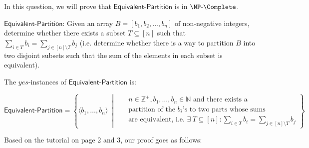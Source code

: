 In this question, we will prove that $\mathsf{Equivalent \text{-} Partition}$ is in $\NP \text{-} \Complete$.

$\mathsf{Equivalent \text{-} Partition}$: Given an array \(B=[b_1,b_2,...,b_n]\) of non-negative integers, determine whether there exists a subset $T \subseteq [n]$ such that $\sum_{i\in T} b_i = \sum_{j \in [n] \setminus T} b_j $ (i.e. determine whether there is a way to partition $B$ into two disjoint subsets such that the sum of the elements in each subset is equivalent).

The $yes$-instances of $\mathsf{Equivalent \text{-} Partition}$ is:

\begin{equation*}
    \mathsf{Equivalent \text{-} Partition}= \left\{\langle{b_1, \ldots, b_{n}\rangle}~\middle|~~~\begin{aligned}
         & n\in \mathbb{Z}^+, b_1, \ldots, b_{n}\in \mathbb{N} \text{ and there exists a} \\ &\text{partition of the $b_i$'s to two parts whose sums}\\ &\text{are equivalent, i.e. }\exists{\:T\subseteq [n]}: \sum_{i\in T} b_i =  \sum_{j\in [n] \setminus T} b_j
    \end{aligned}\right\}
\end{equation*}

Based on the tutorial on page 2 and 3, our proof goes as follows:

